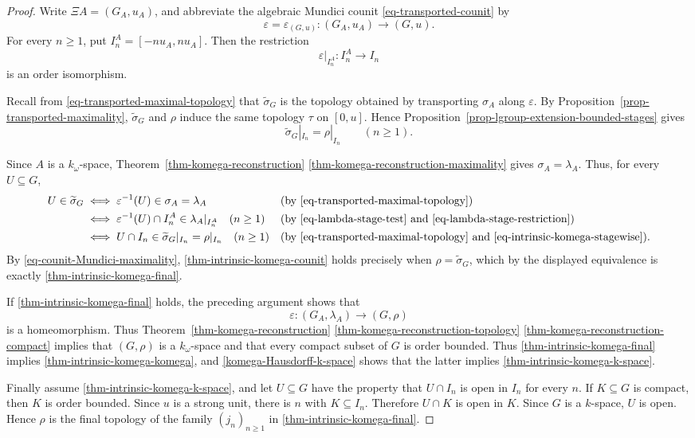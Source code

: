 \documentclass[preprint,3p]{elsarticle}
\theoremstyle{plain}
\theoremstyle{definition}
\numberwithin{equation}{section}
\begin{document}
\begin{proof}
Write $\Xi A=(G_A,u_A)$, and abbreviate the algebraic
Mundici counit \eqref{eq-transported-counit} by
\[
 \varepsilon=\varepsilon_{(G,u)}\colon
 (G_A,u_A)\longrightarrow(G,u).
\]
For every $n\geq1$, put $I_n^A=[-nu_A,nu_A]$.
Then the restriction 
\[
 \varepsilon|_{I_n^A}\colon I_n^A\longrightarrow I_n
\]
is an order isomorphism.

Recall from \eqref{eq-transported-maximal-topology}
that $\widetilde\sigma_G$ is the topology obtained by
transporting $\sigma_A$ along $\varepsilon$.
By Proposition~\ref{prop-transported-maximality},
$\widetilde\sigma_G$ and $\rho$ induce the same topology
$\tau$ on $[0,u]$.  Hence
Proposition~\ref{prop-lgroup-extension-bounded-stages} gives
\begin{equation}
\label{eq-intrinsic-komega-stagewise}
 \widetilde\sigma_G|_{I_n}=\rho|_{I_n}
 \qquad(n\geq1).
\end{equation}

Since $A$ is a $k_\omega$-space,
Theorem~\ref{thm-komega-reconstruction}%
\ref{thm-komega-reconstruction-maximality}
gives $\sigma_A=\lambda_A$.
Thus, for every $U\subseteq G$,
\begin{align*}
 U\in\widetilde\sigma_G
 &\iff \varepsilon^{-1}(U)\in\sigma_A=\lambda_A
 &&\text{(by \eqref{eq-transported-maximal-topology})}\\
 &\iff \varepsilon^{-1}(U)\cap I_n^A
 \in\lambda_A|_{I_n^A}\quad(n\geq1)
 &&\text{(by \eqref{eq-lambda-stage-test}
 and \eqref{eq-lambda-stage-restriction})}\\
 &\iff U\cap I_n\in\widetilde\sigma_G|_{I_n}=\rho|_{I_n}
 \quad(n\geq1)
 &&\text{(by \eqref{eq-transported-maximal-topology}
 and \eqref{eq-intrinsic-komega-stagewise})}.
\end{align*}
By \eqref{eq-counit-Mundici-maximality},
\ref{thm-intrinsic-komega-counit} holds precisely when
$\rho=\widetilde\sigma_G$, which by the displayed
equivalence is exactly \ref{thm-intrinsic-komega-final}.

If \ref{thm-intrinsic-komega-final} holds, the preceding
argument shows that
\[
 \varepsilon\colon
 (G_A,\lambda_A)\longrightarrow(G,\rho)
\]
is a homeomorphism.  Thus
Theorem~\ref{thm-komega-reconstruction}%
\ref{thm-komega-reconstruction-topology}%
\ref{thm-komega-reconstruction-compact}
implies that $(G,\rho)$ is a $k_\omega$-space and that
every compact subset of $G$ is order bounded.  
Thus \ref{thm-intrinsic-komega-final} implies
\ref{thm-intrinsic-komega-komega}, and
\ref{komega-Hausdorff-k-space} shows that the latter implies
\ref{thm-intrinsic-komega-k-space}.

Finally assume \ref{thm-intrinsic-komega-k-space}, and let $U\subseteq G$ have the property that
$U\cap I_n$ is open in $I_n$ for every $n$.  If $K\subseteq G$ is compact,
then $K$ is order bounded.  Since $u$ is a strong unit, there is $n$ with
$K\subseteq I_n$.  Therefore $U\cap K$ is open in $K$.  Since $G$ is a
$k$-space, $U$ is open.  Hence $\rho$ is the final topology of the family
$(j_n)_{n\geq1}$ in \ref{thm-intrinsic-komega-final}.
\end{proof}
\end{document}
